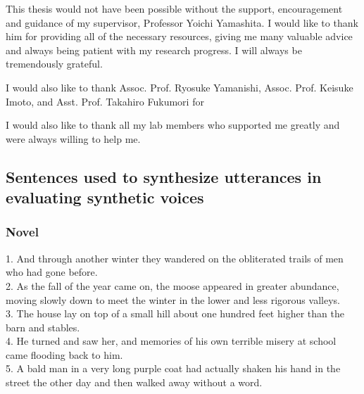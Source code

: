 \documentclass[12pt]{article}
\begin{document}
\clearpage
\acknowledgements
This thesis would not have been possible without the support, encouragement and guidance of my supervisor, Professor Yoichi Yamashita. I would like to thank him for providing all of the necessary resources, giving me many valuable advice and always being patient with my research progress. I will always be tremendously grateful.

I would also like to thank Assoc. Prof. Ryosuke Yamanishi, Assoc. Prof. Keisuke Imoto, and Asst. Prof. Takahiro Fukumori for 

I would also like to thank all my lab members who supported me greatly and were always willing to help me.

\newpage



\clearpage
\appendix
\setcounter{secnumdepth}{0}
\subsection{Sentences used to synthesize utterances in evaluating synthetic voices}\label{sec_appendix}

\subsubsection{Novel}
1.	And through another winter they wandered on the obliterated trails of men who had gone before.\\
2.	As the fall of the year came on, the moose appeared in greater abundance, moving slowly down to meet the winter in the lower and less rigorous valleys.\\
3.	The house lay on top of a small hill about one hundred feet higher than the barn and stables.\\
4.	He turned and saw her, and memories of his own terrible misery at school came flooding back to him.\\
5.	A bald man in a very long purple coat had actually shaken his hand in the street the other day and then walked away without a word.
\end{document}
